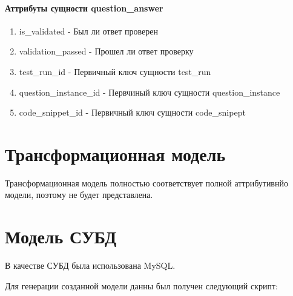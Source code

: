 \documentclass{article}
\begin{document}
\paragraph{Аттрибуты сущности question\_answer}
\begin{enumerate}
	\item is\_validated - Был ли ответ проверен
	\item validation\_passed - Прошел ли ответ проверку
	\item test\_run\_id - Первичный ключ сущности test\_run
	\item question\_instance\_id - Первчиный ключ сущности question\_instance 
	\item code\_snippet\_id - Первичный ключ сущности code\_snipept
\end{enumerate}


\section{Трансформационная модель}
Трансформационная модель полностью соответствует полной
аттрибутивнйо модели, поэтому не будет представлена.


\section{Модель СУБД}
В качестве СУБД была использована MySQL.

Для генерации созданной модели данны был получен
следующий скрипт:
\end{document}
